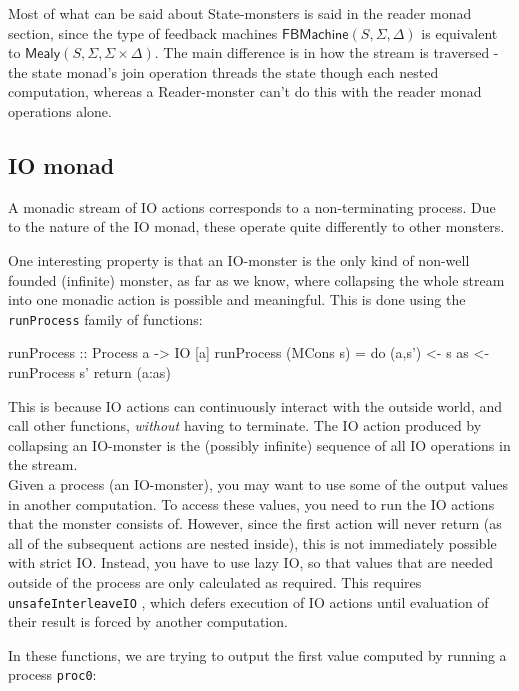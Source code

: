 Most of what can be said about State-monsters is said in the reader monad section, since the type of feedback machines $\mathsf{FBMachine}(S,\Sigma,\Delta)$ is equivalent to $\mathsf{Mealy}(S,\Sigma,\Sigma \times \Delta)$. The main difference is in how the stream is traversed - the state monad's join operation threads the state though each nested computation, whereas a Reader-monster can't do this with the reader monad operations alone.

\subsection{IO monad}

A monadic stream of IO actions corresponds to a non-terminating process. Due to the nature of the IO monad, these operate quite differently to other monsters.

One interesting property is that an IO-monster is the only kind of non-well founded (infinite) monster, as far as we know, where collapsing the whole stream into one monadic action is possible and meaningful. This is done using the \verb+runProcess+ family of functions:

\begin{haskell}
runProcess :: Process a -> IO [a]
runProcess (MCons s) = do (a,s') <- s
                          as     <- runProcess s'
                          return (a:as)
\end{haskell}

This is because IO actions can continuously interact with the outside world, and call other functions, \emph{without} having to terminate. The IO action produced by collapsing an IO-monster is the (possibly infinite) sequence of all IO operations in the stream. \\

Given a process (an IO-monster), you may want to use some of the output values in another computation. To access these values, you need to run the IO actions that the monster consists of. However, since the first action will never return (as all of the subsequent actions are nested inside), this is not immediately possible with strict IO. Instead, you have to use lazy IO, so that values that are needed outside of the process are only calculated as required. This requires \verb+unsafeInterleaveIO+ \cite{unsafe_io}, which defers execution of IO actions until evaluation of their result is forced by another computation. 

In these functions, we are trying to output the first value computed by running a process \verb+proc0+:

